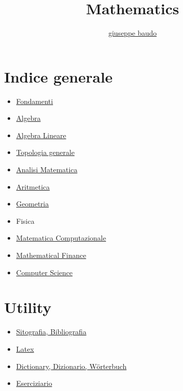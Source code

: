 \documentclass[a4paper,10pt]{article}
\title{Mathematics}
\author{\href{http://www.baudo.hol.es}{giuseppe baudo}}
\begin{document}
\maketitle

\section{Indice generale}
\begin{itemize}
  \item \href{Fondamenti.html}{Fondamenti}
  \item \href{Algebra.html}{Algebra}
  \item \href{AlgebraLineare.html}{Algebra Lineare}
  \item \href{TopologiaGenerale.html}{Topologia generale}
  \item \href{Analisi.html}{Analisi Matematica}
  \item \href{Aritmetica.html}{Aritmetica}  
  \item \href{Geometria.html}{Geometria}
  \item Fisica  
  \item \href{MatematicaComputazionale.html}{Matematica Computazionale}
  \item \href{Finance.html}{Mathematical Finance}  
  \item \href{Programming.html}{Computer Science}  
\end{itemize}

\section{Utility}
\begin{itemize}  
  \item \href{Sitografia.html}{Sitografia, Bibliografia}  
  \item \href{latex.html}{Latex} 
  \item \href{Dictionary.html}{Dictionary, Dizionario, W\"{o}rterbuch}
  \item \href{Eserciziario.html}{Eserciziario}  
\end{itemize}
\end{document}
